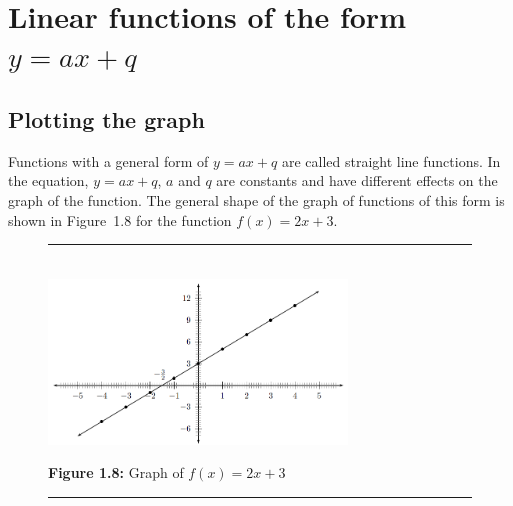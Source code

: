 \section{Linear functions of the form $y=ax+q$}
\nopagebreak

\subsection*{Plotting the graph}       
Functions with a general form of $y=ax+q$ are called straight line functions. In the equation, $y=ax+q$, $a$ and $q$ are constants and have different effects on the graph of the function. The general shape of the graph of functions of this form is shown in Figure~1.8 for the function $f(x)=2x+3$.\par 

\setcounter{subfigure}{0}
\begin{figure}[H] %
\begin{center}
\rule[.1in]{\figurerulewidth}{.005in} \\
\label{m39338*uid69!!!underscore!!!media}\label{m39338*uid69!!!underscore!!!printimage}\includegraphics[width=300px]{col11306.imgs/m39338_MG10C11_005.png} %
\vspace{2pt}
\vspace{\rubberspace}\par \begin{cnxcaption}
\small \textbf{Figure 1.8: }Graph of $f(x)=2x+3$
\end{cnxcaption}
\vspace{.1in}
\rule[.1in]{\figurerulewidth}{.005in} \\
\end{center}
\end{figure}       

